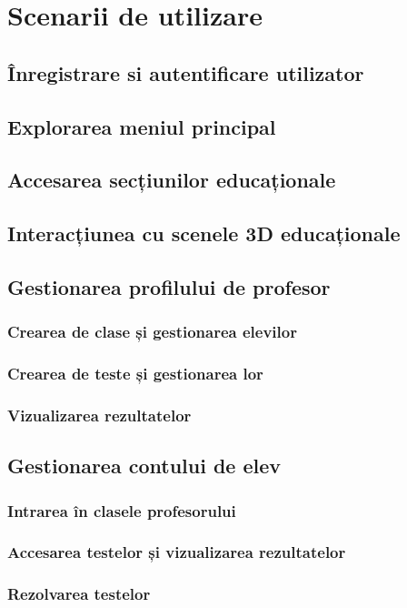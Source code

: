 \chapter{Scenarii de utilizare}
\label{chapter:scenariiUtilizare}

\section{Înregistrare si autentificare utilizator}
\label{sec:inregistrare-utilizator}

\section{Explorarea meniul principal}
\label{sec:explorare-meniu-principal}

\section{Accesarea secțiunilor educaționale}
\label{subsec:accesare-sectiuni-educationale}

\section{Interacțiunea cu scenele 3D educaționale}
\label{subsec:interactiune-scene-3d}

\section{Gestionarea profilului de profesor}
\label{sec:gestionare-profil-utilizator}

\subsection{Crearea de clase și gestionarea elevilor}
\label{subsec:creare-clase-elevi}

\subsection{Crearea de teste și gestionarea lor}
\label{subsec:creare-teste}

\subsection{Vizualizarea rezultatelor}
\label{subsec:vizualizare-rezultate}

\section{Gestionarea contului de elev}
\label{subsec:gestionare-cont-elev}

\subsection{Intrarea în clasele profesorului}
\label{subsec:intrare-clase-profesor}

\subsection{Accesarea testelor și vizualizarea rezultatelor}
\label{subsec:accesare-teste-elev}

\subsection{Rezolvarea testelor}
\label{subsec:rezolvare-teste}